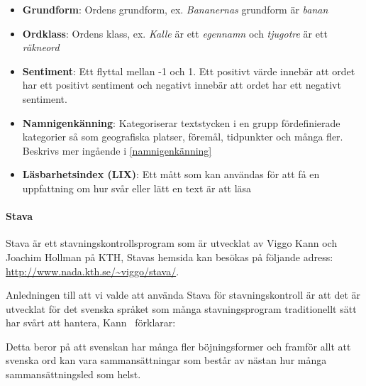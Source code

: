 \documentclass[swedish]{maucsthesis}
\begin{document}
\begin{itemize}
\item \textbf{Grundform}: Ordens grundform, ex. \textit{Bananernas} grundform är
  \textit{banan}
\item \textbf{Ordklass}: Ordens klass, ex. \textit{Kalle} är ett
  \textit{egennamn} och \textit{tjugotre} är ett \textit{räkneord}
\item \textbf{Sentiment}: Ett flyttal mellan -1 och 1. Ett positivt värde innebär att ordet har ett positivt sentiment och negativt innebär att ordet har ett negativt sentiment.
\item \textbf{Namnigenkänning}: Kategoriserar textstycken i en grupp
  fördefinierade kategorier så som geografiska platser, föremål, tidpunkter och
  många fler. Beskrivs mer ingående i \cref{namnigenkänning}
\item \textbf{Läsbarhetsindex (LIX)}: Ett mått som kan användas för att få en
  uppfattning om hur svår eller lätt en text är att läsa
\end{itemize}

\paragraph*{Stava}\label{stava}
Stava \cite{kann:2016} är ett stavningskontrollsprogram som är utvecklat av Viggo Kann och
Joachim Hollman på KTH, Stavas hemsida kan besökas på följande adress:\newline 
\url{http://www.nada.kth.se/~viggo/stava/}. 

Anledningen till att vi valde att använda Stava för
stavningskontroll är att det är utvecklat för det svenska språket som många
stavningsprogram traditionellt sätt har svårt att hantera, Kann~\cite{kann:1997}
förklarar:

\begin{displayquote}
  Detta beror på att svenskan har många fler böjningsformer och framför allt att
  svenska ord kan vara sammansättningar som består av nästan hur många
  sammansättningsled som helst.
\end{displayquote}
\end{document}
